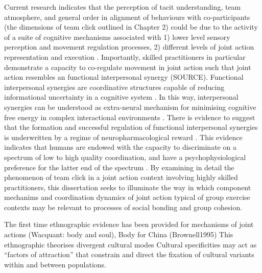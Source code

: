 Current research indicates that the perception of tacit understanding, team atmosphere, and general order in alignment of behaviours with co-participants (the dimensions of team click outlined in Chapter 2) could be due to the activity of a suite of cognitive mechanisms associated with 1) lower level sensory perception and movement regulation processes, 2) different levels of joint action representation and execution \citep{Semin2008,Frith2008,Pesquita2017}.
Importantly, skilled practitioners in particular demonstrate a capacity to co-regulate movement in joint action such that joint action resembles an functional interpersonal synergy (SOURCE).  Functional interpersonal synergies are coordinative structures capable of reducing informational uncertainty in a cognitive system \citep{Riley2011}. In this way, interpersonal synergies can be understood as extra-neural mechanism for minimising cognitive free energy in complex interactional environments \citep{Clark2013}. There is evidence to suggest that the formation and successful regulation of functional interpersonal synergies is underwritten by a regime of neuropharmacological reward \citep{Ross2013}. This evidence indicates that humans are endowed with the capacity to discriminate on a spectrum of low to high quality coordination, and have a psychophysiological preference for the latter end of the spectrum \citep{Marsh2009}.  By examining in detail the phenomenon of team click in a joint action context involving highly skilled practitioners, this dissertation seeks to illuminate the way in which component mechanims and coordination dynamics of joint action typical of group exercise contexts may be relevant to processes of social bonding and group cohesion.




The first time ethnographic evidence has been provided for mechanisms of joint actions (Wacquant: body and soul), Body for China (Brownell1995)
This ethnographic theorises divergent cultural modes
Cultural specificities may act as ``factors of attraction'' \citep{Sperber2014} that constrain and direct the fixation of cultural variants within and between populations.







